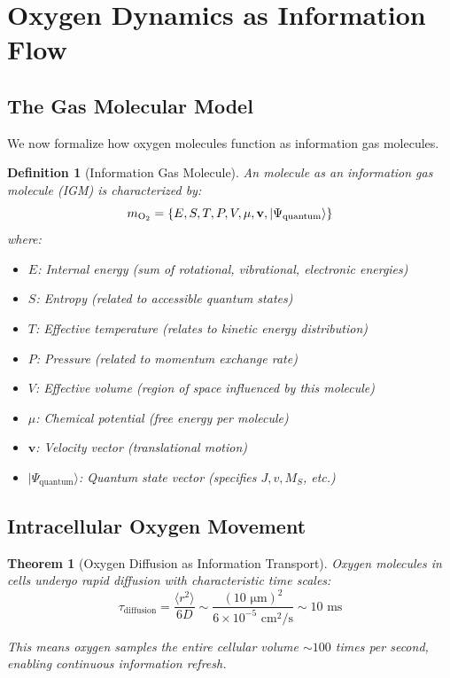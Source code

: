 \documentclass[12pt,a4paper]{article}
\newtheorem{theorem}{Theorem}
\newtheorem{definition}{Definition}
\begin{document}
\section{Oxygen Dynamics as Information Flow}

\subsection{The Gas Molecular Model}

We now formalize how oxygen molecules function as information gas molecules.

\begin{definition}[Information Gas Molecule]
\label{def:info_gas_molecule}
An  molecule as an information gas molecule (IGM) is characterized by:
\begin{equation}
m_{\ce{O2}} = \{E, S, T, P, V, \mu, \mathbf{v}, |\Psi_{\text{quantum}}\rangle\}
\end{equation}
where:
\begin{itemize}
\item $E$: Internal energy (sum of rotational, vibrational, electronic energies)
\item $S$: Entropy (related to accessible quantum states)
\item $T$: Effective temperature (relates to kinetic energy distribution)
\item $P$: Pressure (related to momentum exchange rate)
\item $V$: Effective volume (region of space influenced by this molecule)
\item $\mu$: Chemical potential (free energy per molecule)
\item $\mathbf{v}$: Velocity vector (translational motion)
\item $|\Psi_{\text{quantum}}\rangle$: Quantum state vector (specifies $J, v, M_S$, etc.)
\end{itemize}
\end{definition}

\subsection{Intracellular Oxygen Movement}

\begin{theorem}[Oxygen Diffusion as Information Transport]
\label{thm:oxygen_diffusion}
Oxygen molecules in cells undergo rapid diffusion with characteristic time scales:
\begin{equation}
\tau_{\text{diffusion}} = \frac{\langle r^2 \rangle}{6D} \sim \frac{(10 \text{ μm})^2}{6 \times 10^{-5} \text{ cm}^2/\text{s}} \sim 10 \text{ ms}
\end{equation}

This means oxygen samples the entire cellular volume $\sim 100$ times per second, enabling continuous information refresh.
\end{theorem}
\end{document}
